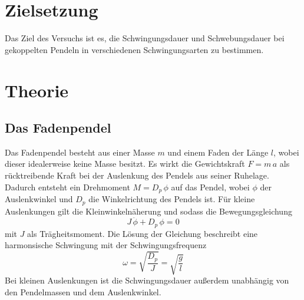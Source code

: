 \section{Zielsetzung}
\label{sec:Zielsetzung}
Das Ziel des Versuchs ist es, die Schwingungsdauer und Schwebungsdauer bei gekoppelten Pendeln in verschiedenen Schwingungsarten zu bestimmen.

\section{Theorie}
\label{sec:Theorie}

\subsection{Das Fadenpendel} %
\label{sub:Fadenpendel}
Das Fadenpendel besteht aus einer Masse $m$ und einem Faden der Länge $l$, wobei dieser idealerweise keine Masse besitzt.
Es wirkt die Gewichtskraft $F=m\,a$ als rücktreibende Kraft bei der Auslenkung des Pendels aus seiner Ruhelage.
Dadurch entsteht ein Drehmoment $M=D_p\, \phi$ auf das Pendel, wobei $\phi$ der Auslenkwinkel und $D_p$ die Winkelrichtung des Pendels ist.
Für kleine Auslenkungen gilt die Kleinwinkelnäherung und sodass die Bewegungsgleichung
\begin{equation}
    J \, \ddot{\phi} + D_p \, \phi = 0
\end{equation}
mit $J$ als Trägheitsmoment.
Die Lösung der Gleichung beschreibt eine harmonsische Schwingung mit der Schwingungsfrequenz
\begin{equation}
    \omega = \sqrt{\frac{D_p}{J}} = \sqrt{\frac{g}{l}}
\end{equation}
Bei kleinen Auslenkungen ist die Schwingungsdauer außerdem unabhängig von den Pendelmassen und dem Auslenkwinkel.
 

